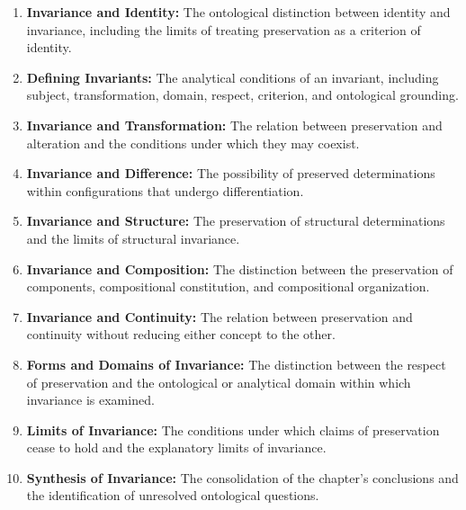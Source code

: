\begin{enumerate}

    \item \textbf{Invariance and Identity:}
    The ontological distinction between identity
    and invariance, including the limits of treating
    preservation as a criterion of identity.

    \item \textbf{Defining Invariants:}
    The analytical conditions of an invariant,
    including subject, transformation, domain,
    respect, criterion, and ontological grounding.

    \item \textbf{Invariance and Transformation:}
    The relation between preservation and alteration
    and the conditions under which they may coexist.

    \item \textbf{Invariance and Difference:}
    The possibility of preserved determinations
    within configurations that undergo differentiation.

    \item \textbf{Invariance and Structure:}
    The preservation of structural determinations
    and the limits of structural invariance.

    \item \textbf{Invariance and Composition:}
    The distinction between the preservation of
    components, compositional constitution, and
    compositional organization.

    \item \textbf{Invariance and Continuity:}
    The relation between preservation and continuity
    without reducing either concept to the other.

    \item \textbf{Forms and Domains of Invariance:}
    The distinction between the respect of preservation
    and the ontological or analytical domain within
    which invariance is examined.

    \item \textbf{Limits of Invariance:}
    The conditions under which claims of preservation
    cease to hold and the explanatory limits of
    invariance.

    \item \textbf{Synthesis of Invariance:}
    The consolidation of the chapter's conclusions
    and the identification of unresolved ontological
    questions.

\end{enumerate}

